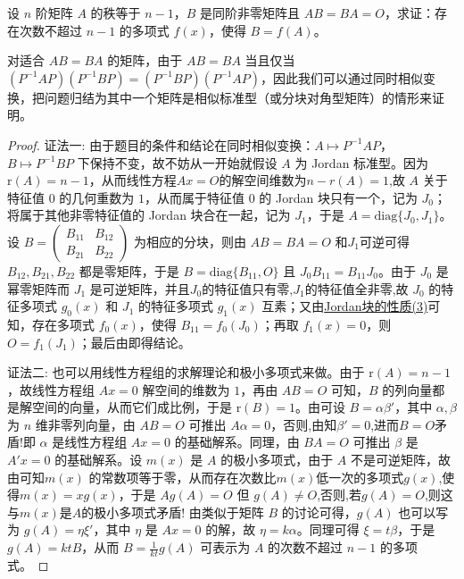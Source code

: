 \documentclass[../../main.tex]{subfiles}%
\begin{document}
\begin{proposition}\label{proposition:与秩为n-1的矩阵乘法可交换的矩阵也可被其多项式表示}
设 $n$ 阶矩阵 $A$ 的秩等于 $n - 1$，$B$ 是同阶非零矩阵且 $AB = BA = O$，求证：存在次数不超过 $n - 1$ 的多项式 $f(x)$，使得 $B = f(A)$。
\end{proposition}
\begin{remark}
对适合 $AB = BA$ 的矩阵，由于 $AB = BA$ 当且仅当 $(P^{-1}AP)(P^{-1}BP)=(P^{-1}BP)(P^{-1}AP)$，因此我们可以通过同时相似变换，把问题归结为其中一个矩阵是相似标准型（或分块对角型矩阵）的情形来证明。
\end{remark}
\begin{proof}

{\color{blue}证法一:}
由于题目的条件和结论在同时相似变换：$A\mapsto P^{-1}AP$，$B\mapsto P^{-1}BP$ 下保持不变，故不妨从一开始就假设 $A$ 为 Jordan 标准型。因为 $\mathrm{r}(A)=n - 1$，从而线性方程$Ax=O$的解空间维数为$n-r(A)=1$,故 $A$ 关于特征值 $0$ 的几何重数为 $1$，从而属于特征值 $0$ 的 Jordan 块只有一个，记为 $J_0$；将属于其他非零特征值的 Jordan 块合在一起，记为 $J_1$，于是 $A = \mathrm{diag}\{J_0,J_1\}$。设 $B=\begin{pmatrix}
B_{11} & B_{12} \\
B_{21} & B_{22}
\end{pmatrix}$ 为相应的分块，则由 $AB = BA = O$ 和$J_1$可逆可得 $B_{12},B_{21},B_{22}$ 都是零矩阵，于是 $B = \mathrm{diag}\{B_{11},O\}$ 且 $J_0B_{11}=B_{11}J_0$。由于 $J_0$ 是幂零矩阵而 $J_1$ 是可逆矩阵，并且$J_0$的特征值只有零,$J_1$的特征值全非零,故 $J_0$ 的特征多项式 $g_0(x)$ 和 $J_1$ 的特征多项式 $g_1(x)$ 互素；又由\hyperref[proposition:Jordan块的性质]{Jordan块的性质(3)}可知，存在多项式 $f_0(x)$，使得 $B_{11}=f_0(J_0)$；再取 $f_1(x)=0$，则 $O = f_1(J_1)$；最后由即得结论。

{\color{blue}证法二:}
也可以用线性方程组的求解理论和极小多项式来做。由于 $\mathrm{r}(A)=n - 1$，故线性方程组 $Ax = 0$ 解空间的维数为 $1$，再由 $AB = O$ 可知，$B$ 的列向量都是解空间的向量，从而它们成比例，于是 $\mathrm{r}(B)=1$。由可设 $B = \alpha\beta'$，其中 $\alpha,\beta$ 为 $n$ 维非零列向量，由 $AB = O$ 可推出 $A\alpha = 0$，否则,由知$\beta'=0$,进而$B=O$矛盾!即 $\alpha$ 是线性方程组 $Ax = 0$ 的基础解系。同理，由 $BA = O$ 可推出 $\beta$ 是 $A'x = 0$ 的基础解系。设 $m(x)$ 是 $A$ 的极小多项式，由于 $A$ 不是可逆矩阵，故由可知$m(x)$ 的常数项等于零，从而存在次数比$m(x)$低一次的多项式$g(x)$,使得$m(x)=xg(x)$，于是 $Ag(A)=O$ 但 $g(A)\neq O$,否则,若$g(A)=O$,则这与$m(x)$是$A$的极小多项式矛盾! 由类似于矩阵 $B$ 的讨论可得，$g(A)$ 也可以写为 $g(A)=\eta\xi'$，其中 $\eta$ 是 $Ax = 0$ 的解，故 $\eta = k\alpha$。同理可得 $\xi = t\beta$，于是 $g(A)=ktB$，从而 $B = \frac{1}{kt}g(A)$ 可表示为 $A$ 的次数不超过 $n - 1$ 的多项式。

\end{proof}
\end{document}
